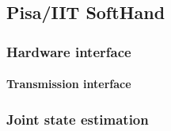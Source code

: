 \subsection{Pisa/IIT SoftHand}
\label{sec:softhand}

\subsubsection{Hardware interface}

\paragraph{Transmission interface}

\subsubsection{Joint state estimation}